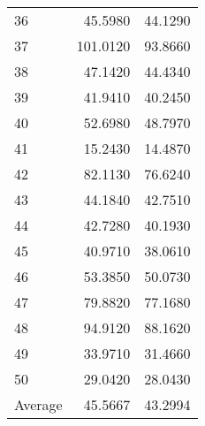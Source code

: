 \documentclass[12pt]{article}
\begin{document}
\begin{longtable}{|l|r|r|}
36 &  45.5980 & 44.1290 \\
37 & 101.0120 & 93.8660 \\
38 &  47.1420 & 44.4340 \\
39 &  41.9410 & 40.2450 \\
40 &  52.6980 & 48.7970 \\
41 &  15.2430 & 14.4870 \\
42 &  82.1130 & 76.6240 \\
43 &  44.1840 & 42.7510 \\
44 &  42.7280 & 40.1930 \\
45 &  40.9710 & 38.0610 \\
46 &  53.3850 & 50.0730 \\
47 &  79.8820 & 77.1680 \\
48 &  94.9120 & 88.1620 \\
49 &  33.9710 & 31.4660 \\
50 &  29.0420 & 28.0430 \\
\hline
Average & 45.5667 & 43.2994 \\
\hline
\end{longtable}

\pagebreak
\end{document}

